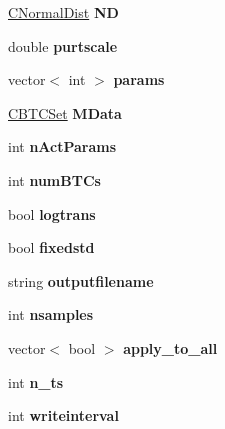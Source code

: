 \begin{DoxyCompactItemize}
\hyperlink{class_c_normal_dist}{C\+Normal\+Dist} {\bfseries ND}
\item 
\mbox{\label{class_c_m_c_m_c_a2250d33a8f0abae8039f09d934250f44}} 
double {\bfseries purtscale}
\item 
\mbox{\label{class_c_m_c_m_c_abb8a4f95b940f832f28ca1bc49491460}} 
vector$<$ int $>$ {\bfseries params}
\item 
\mbox{\label{class_c_m_c_m_c_a923589266bd255c19933de3e5e225792}} 
\hyperlink{class_c_b_t_c_set}{C\+B\+T\+C\+Set} {\bfseries M\+Data}
\item 
\mbox{\label{class_c_m_c_m_c_a8ade2c9bd34e7633f6333e86e6477948}} 
int {\bfseries n\+Act\+Params}
\item 
\mbox{\label{class_c_m_c_m_c_a665e36a9a60ec93f3cf69c2993b48bc4}} 
int {\bfseries num\+B\+T\+Cs}
\item 
\mbox{\label{class_c_m_c_m_c_a9a301dd8819e602a6ba7c64b814ea28d}} 
bool {\bfseries logtrans}
\item 
\mbox{\label{class_c_m_c_m_c_a8a54d378e25fd080de937764d5d1365d}} 
bool {\bfseries fixedstd}
\item 
\mbox{\label{class_c_m_c_m_c_aac8161ebd545959bddcd553190c02f26}} 
string {\bfseries outputfilename}
\item 
\mbox{\label{class_c_m_c_m_c_afa8464ef7daa121d1422649d2afec45d}} 
int {\bfseries nsamples}
\item 
\mbox{\label{class_c_m_c_m_c_a6bfc713fbf71d158ad0f9b0e313b3f5d}} 
vector$<$ bool $>$ {\bfseries apply\+\_\+to\+\_\+all}
\item 
\mbox{\label{class_c_m_c_m_c_a5d3c10e0e1144ac93b7eadc20ddffd2e}} 
int {\bfseries n\+\_\+ts}
\item 
\mbox{\label{class_c_m_c_m_c_a359d8de4cce9c2f446bdb222f22d2cb9}} 
int {\bfseries writeinterval}
\item 

\end{DoxyCompactItemize}
